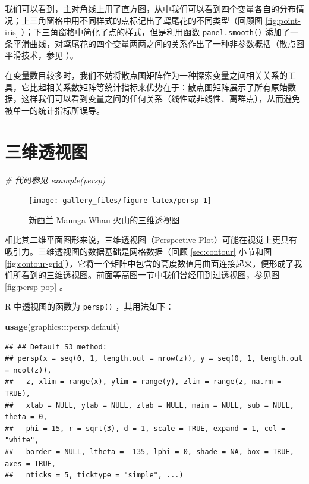 \documentclass[
  b5paper,
  UTF8,twoside]{book}
\newenvironment{Shaded}{\begin{snugshade}}{\end{snugshade}}
\newcommand{\CommentTok}[1]{\textcolor[rgb]{0.56,0.35,0.01}{\textit{#1}}}
\newcommand{\FunctionTok}[1]{\textcolor[rgb]{0.13,0.29,0.53}{\textbf{#1}}}
\newcommand{\NormalTok}[1]{#1}
\newcommand{\SpecialCharTok}[1]{\textcolor[rgb]{0.81,0.36,0.00}{\textbf{#1}}}
\begin{document}
我们可以看到，主对角线上用了直方图，从中我们可以看到四个变量各自的分布情况；上三角窗格中用不同样式的点标记出了鸢尾花的不同类型（回顾图 \ref{fig:point-iris}
）；下三角窗格中简化了点的样式，但是利用函数 \texttt{panel.smooth()} 添加了一条平滑曲线，对鸢尾花的四个变量两两之间的关系作出了一种非参数概括（散点图平滑技术，参见 \citet{Cleveland79}）。

在变量数目较多时，我们不妨将散点图矩阵作为一种探索变量之间相关关系的工具，它比起相关系数矩阵等统计指标来优势在于：散点图矩阵展示了所有原始数据，这样我们可以看到变量之间的任何关系（线性或非线性、离群点），从而避免被单一的统计指标所误导。

\section{三维透视图}\label{sec:persp}

\begin{Shaded}
\begin{Highlighting}[]
\CommentTok{\# 代码参见 example(persp)}
\end{Highlighting}
\end{Shaded}





\begin{figure}

{\centering \texttt{[image: gallery\_files/figure-latex/persp-1]} 

}

\caption[新西兰 Maunga Whau 火山的三维透视图]{新西兰 Maunga Whau 火山的三维透视图}\label{fig:persp}
\end{figure}

相比其二维平面图形来说，三维透视图（Perspective Plot）可能在视觉上更具有吸引力。三维透视图的数据基础是网格数据（回顾 \ref{sec:contour} 小节和图 \ref{fig:contour-grid}），它将一个矩阵中包含的高度数值用曲面连接起来，便形成了我们所看到的三维透视图。前面等高图一节中我们曾经用到过透视图，参见图 \ref{fig:persp-pop}
。

R 中透视图的函数为 \texttt{persp()} ，其用法如下：

\begin{Shaded}
\begin{Highlighting}[]
\FunctionTok{usage}\NormalTok{(graphics}\SpecialCharTok{:::}\NormalTok{persp.default)}
\end{Highlighting}
\end{Shaded}

\begin{verbatim}
## ## Default S3 method:
## persp(x = seq(0, 1, length.out = nrow(z)), y = seq(0, 1, length.out = ncol(z)),
##   z, xlim = range(x), ylim = range(y), zlim = range(z, na.rm = TRUE),
##   xlab = NULL, ylab = NULL, zlab = NULL, main = NULL, sub = NULL, theta = 0,
##   phi = 15, r = sqrt(3), d = 1, scale = TRUE, expand = 1, col = "white",
##   border = NULL, ltheta = -135, lphi = 0, shade = NA, box = TRUE, axes = TRUE,
##   nticks = 5, ticktype = "simple", ...)
\end{verbatim}
\end{document}
